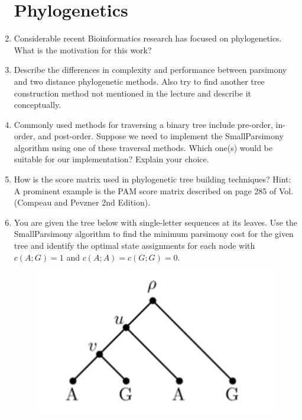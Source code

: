 \documentclass[11pt,runningheads,a4paper]{article}
\begin{document}
\begin{enumerate}
\section*{Phylogenetics}
  \item Considerable recent Bioinformatics research has focused on phylogenetics. What is the motivation for this work?
  \item Describe the differences in complexity and performance between parsimony and two distance phylogenetic methods. Also try to find another tree construction method not mentioned in the lecture and describe it conceptually.
  \item Commonly used methods for traversing a binary tree include pre-order, in-order, and post-order.
    Suppose we need to implement the SmallParsimony algorithm using one of these traversal methods.
    Which one(s) would be suitable for our implementation? Explain your choice.
  \item  How is the score matrix used in phylogenetic tree building techniques? Hint: A prominent example is the PAM score matrix described on page 285 of Vol. (Compeau and Pevzner 2nd Edition).
  \item You are given the tree below with single-letter sequences at its leaves.
    Use the SmallParsimony algorithm to find the minimum parsimony cost for the given tree and identify the optimal state assignments for each node with $c(A; G) = 1$ and $c(A; A) = c(G; G) = 0$.
    \begin{figure}[h]
      \centering
      \includegraphics[scale=0.25]{img/Bioinformatics_Problem_Sheet2_fig1.png}

\end{figure}
\end{enumerate}
\end{document}
